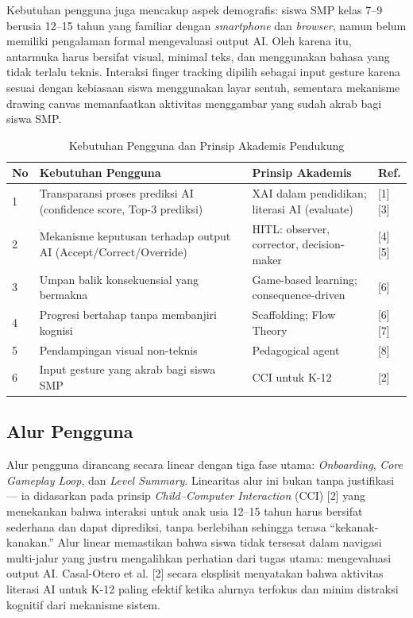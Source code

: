 \documentclass[10pt,twoside,openright]{report}
\begin{document}
Kebutuhan pengguna juga mencakup aspek demografis: siswa SMP kelas 7--9 berusia 12--15 tahun yang familiar dengan \textit{smartphone} dan \textit{browser}, namun belum memiliki pengalaman formal mengevaluasi output AI. Oleh karena itu, antarmuka harus bersifat visual, minimal teks, dan menggunakan bahasa yang tidak terlalu teknis. Interaksi finger tracking dipilih sebagai input gesture karena sesuai dengan kebiasaan siswa menggunakan layar sentuh, sementara mekanisme drawing canvas memanfaatkan aktivitas menggambar yang sudah akrab bagi siswa SMP.

\begin{table}[H]
\centering
\caption{Kebutuhan Pengguna dan Prinsip Akademis Pendukung}
\label{tab:kebutuhan-pengguna}
\begin{tabular}{|p{0.5cm}|p{5cm}|p{4cm}|p{2.5cm}|}
\hline
\textbf{No} & \textbf{Kebutuhan Pengguna} & \textbf{Prinsip Akademis} & \textbf{Ref.} \\ \hline
1 & Transparansi proses prediksi AI (confidence score, Top-3 prediksi) & XAI dalam pendidikan; literasi AI (evaluate) & [1][3] \\ \hline
2 & Mekanisme keputusan terhadap output AI (Accept/Correct/Override) & HITL: observer, corrector, decision-maker & [4][5] \\ \hline
3 & Umpan balik konsekuensial yang bermakna & Game-based learning; consequence-driven & [6] \\ \hline
4 & Progresi bertahap tanpa membanjiri kognisi & Scaffolding; Flow Theory & [6][7] \\ \hline
5 & Pendampingan visual non-teknis & Pedagogical agent & [8] \\ \hline
6 & Input gesture yang akrab bagi siswa SMP & CCI untuk K-12 & [2] \\ \hline
\end{tabular}
\end{table}


\subsection{Alur Pengguna}
\label{subsec:alur-pengguna}

Alur pengguna dirancang secara linear dengan tiga fase utama: \textit{Onboarding}, \textit{Core Gameplay Loop}, dan \textit{Level Summary}. Linearitas alur ini bukan tanpa justifikasi --- ia didasarkan pada prinsip \textit{Child--Computer Interaction} (CCI) [2] yang menekankan bahwa interaksi untuk anak usia 12--15 tahun harus bersifat sederhana dan dapat diprediksi, tanpa berlebihan sehingga terasa ``kekanak-kanakan.'' Alur linear memastikan bahwa siswa tidak tersesat dalam navigasi multi-jalur yang justru mengalihkan perhatian dari tugas utama: mengevaluasi output AI. Casal-Otero et al. [2] secara eksplisit menyatakan bahwa aktivitas literasi AI untuk K-12 paling efektif ketika alurnya terfokus dan minim distraksi kognitif dari mekanisme sistem.
\end{document}
